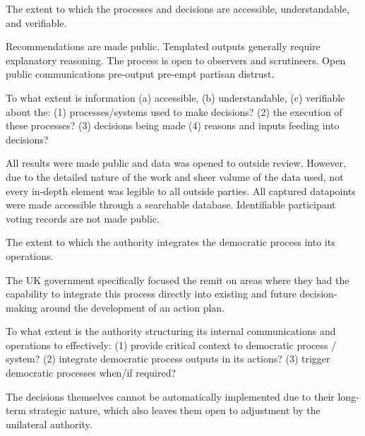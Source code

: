     
    \begin{describe}[grey]
        \vspace{2pt}
        The extent to which the processes and decisions are accessible, understandable, and verifiable.
    \end{describe}

    Recommendations are made public. Templated outputs generally require explanatory reasoning. The process is open to observers and scrutineers. Open public communications pre-output pre-empt partisan distrust.
    
    \begin{evaluate}[grey]
        \vspace{2pt}
        To what extent is information (a) accessible, (b) understandable, (c) verifiable about the: (1) processes/systems used to make decisions? (2) the execution of these processes? (3) decisions being made (4) reasons and inputs feeding into decisions?
    \end{evaluate}

    All results were made public and data was opened to outside review. However, due to the detailed nature of the work and sheer volume of the data used, not every in-depth element was legible to all outside parties. All captured datapoints were made accessible through a searchable database. Identifiable participant voting records are not made public.
    
    
    \begin{describe}[grey]
        The extent to which the authority integrates the democratic process into its operations.
    \end{describe}

    The UK government specifically focused the remit on areas where they had the capability to integrate this process directly into existing and future decision-making around the development of an action plan.
    
    \begin{evaluate}[grey]
        To what extent is the authority structuring its internal communications and operations to effectively: (1) provide critical context to democratic process / system? (2) integrate democratic process outputs in its actions? (3) trigger democratic processes when/if required?
    \end{evaluate}

    The decisions themselves cannot be automatically implemented due to their long-term strategic nature, which also leaves them open to adjustment by the unilateral authority.


